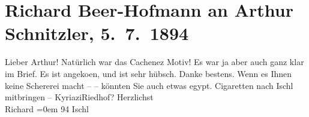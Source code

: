 

         \renewcommand{\erwaehnteInstitutionen}{Institutionen: Kyriazi Frères}
         \renewcommand{\erwaehnteOrte}{Orte: Bad Ischl, Riedhof, Wien, Ägypten}
         \renewcommand{\erwaehnteWerke}{}
               \section[Richard Beer-Hofmann an Arthur Schnitzler, 5. 7. 1894]{ Richard Beer-Hofmann an Arthur Schnitzler, 5. 7. 1894}\nopagebreak{}\rehead{ }\begin{ledgroupsized}[t]{13cm}\normalsize\beginnumbering \toendnotes[C]{\smallbreak\pagebreak[2]} 
\toendnotes[C]{\smallbreak}\pstart
           \noindent{}{\pb}Lieber Arthur! Natürlich war das Cachenez Motiv! Es war ja aber auch
               ganz klar im Brief. Es ist angeko{\geminationm}en, und ist sehr
               hübsch. Danke {\pb}bestens. Wenn es
               Ihnen keine Schererei macht –  – könnten Sie
               auch etwas egypt. Cigaretten nach Ischl mitbringen – KyriaziRiedhof?\pend
           \pstart
            Herzlichst{\\[\baselineskip]}\spacefill\mbox{Richard}\pend
           \leftskip=0em{}\pstart
           \label{T_L00347-1v}\label{T_L00347-1h} 94{ }Ischl\pend
           
         
         \endnumbering{}\end{ledgroupsized}  \newcommand{\dateiname}{L00347}\newcommand{\titel}{Richard Beer-Hofmann an Arthur Schnitzler, 5. 7. 1894}\newcommand{\editorInnen}{Martin Anton Müller und Gerd-Hermann Susen}
      